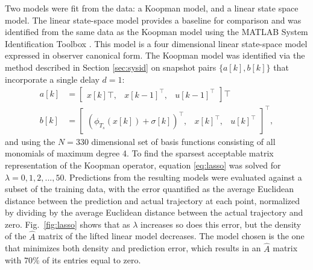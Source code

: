 Two models were fit from the data: a Koopman model, and a linear state space model.
The linear state-space model provides a baseline for comparison and was identified from the same data as the Koopman model using the MATLAB System Identification Toolbox \cite{MATLAB:2017}.
This model is a four dimensional linear state-space model expressed in observer canonical form.
The Koopman model was identified via the method described in Section \ref{sec:sysid} on snapshot pairs $\{ a[k] , b[k] \}$ that incorporate a single delay $d = 1$:
\begin{align}
    a[k] &= \begin{bmatrix} x[k]\top , & x[k-1]^\top , & u[k-1]^\top \end{bmatrix}\top \\
    b[k] &= \begin{bmatrix} \left( \phi_{T_s} (x[k]) + \sigma[k] \right)^\top, & x[k]^\top, & u[k]^\top \end{bmatrix}^\top,
\end{align}
and using the $N=330$ dimensional set of basis functions consisting of all monomials of maximum degree 4.
To find the sparsest acceptable matrix representation of the Koopman operator, equation \eqref{eq:lasso} was solved for ${ \lambda = 0,1,2, ... ,50 }$.
Predictions from the resulting models were evaluated against a subset of the training data, with the error quantified as the average Euclidean distance between the prediction and actual trajectory at each point, normalized by dividing by the average Euclidean distance between the actual trajectory and zero.
Fig.~\ref{fig:lasso} shows that as $\lambda$ increases so does this error, but the density of the $\hat{A}$ matrix of the lifted linear model decreases.
The model chosen is the one that minimizes both density and prediction error, which results in an $\hat{A}$ matrix with $70 \%$ of its entries equal to zero.

